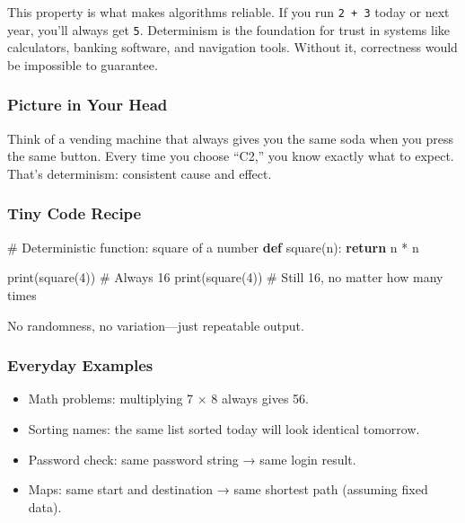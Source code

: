 \documentclass[
  letterpaper,
  DIV=11,
  numbers=noendperiod]{scrreprt}
\newenvironment{Shaded}{\begin{snugshade}}{\end{snugshade}}
\newcommand{\BuiltInTok}[1]{\textcolor[rgb]{0.00,0.23,0.31}{#1}}
\newcommand{\CommentTok}[1]{\textcolor[rgb]{0.37,0.37,0.37}{#1}}
\newcommand{\ControlFlowTok}[1]{\textcolor[rgb]{0.00,0.23,0.31}{\textbf{#1}}}
\newcommand{\DecValTok}[1]{\textcolor[rgb]{0.68,0.00,0.00}{#1}}
\newcommand{\KeywordTok}[1]{\textcolor[rgb]{0.00,0.23,0.31}{\textbf{#1}}}
\newcommand{\NormalTok}[1]{\textcolor[rgb]{0.00,0.23,0.31}{#1}}
\newcommand{\OperatorTok}[1]{\textcolor[rgb]{0.37,0.37,0.37}{#1}}
\providecommand{\tightlist}{%
  \setlength{\itemsep}{0pt}\setlength{\parskip}{0pt}}
\begin{document}
This property is what makes algorithms reliable. If you run
\texttt{2\ +\ 3} today or next year, you'll always get \texttt{5}.
Determinism is the foundation for trust in systems like calculators,
banking software, and navigation tools. Without it, correctness would be
impossible to guarantee.

\subsubsection{Picture in Your Head}\label{picture-in-your-head-20}

Think of a vending machine that always gives you the same soda when you
press the same button. Every time you choose ``C2,'' you know exactly
what to expect. That's determinism: consistent cause and effect.

\subsubsection{Tiny Code Recipe}\label{tiny-code-recipe-18}

\begin{Shaded}
\begin{Highlighting}[]
\CommentTok{\# Deterministic function: square of a number}
\KeywordTok{def}\NormalTok{ square(n):}
    \ControlFlowTok{return}\NormalTok{ n }\OperatorTok{*}\NormalTok{ n}

\BuiltInTok{print}\NormalTok{(square(}\DecValTok{4}\NormalTok{))   }\CommentTok{\# Always 16}
\BuiltInTok{print}\NormalTok{(square(}\DecValTok{4}\NormalTok{))   }\CommentTok{\# Still 16, no matter how many times}
\end{Highlighting}
\end{Shaded}

No randomness, no variation---just repeatable output.

\subsubsection{Everyday Examples}\label{everyday-examples-19}

\begin{itemize}
\tightlist
\item
  Math problems: multiplying 7 × 8 always gives 56.
\item
  Sorting names: the same list sorted today will look identical
  tomorrow.
\item
  Password check: same password string → same login result.
\item
  Maps: same start and destination → same shortest path (assuming fixed
  data).
\end{itemize}
\end{document}
